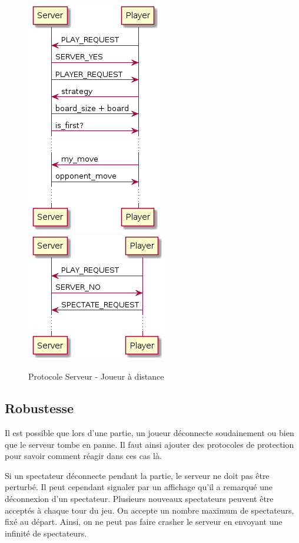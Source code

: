 \documentclass[a4paper]{article}
\begin{document}
%
\begin{figure}[H]
	\centering
	\includegraphics[scale=0.6]{playeryes.png} \hspace{1cm}
	\includegraphics[scale=0.6]{playerno.png}
	\caption{Protocole Serveur - Joueur à distance}
\end{figure}
%


\subsection{Robustesse}

Il est possible que lors d'une partie, un joueur déconnecte soudainement ou 
bien que le serveur tombe en panne. Il faut ainsi ajouter des protocoles de 
protection pour savoir comment réagir dans ces cas là.

Si un spectateur déconnecte pendant la partie, le serveur ne doit pas être 
perturbé. Il peut cependant signaler par un affichage qu'il a remarqué une 
déconnexion d'un spectateur.
Plusieurs nouveaux spectateurs peuvent être acceptés à chaque tour du jeu. On accepte un nombre maximum de spectateurs, fixé au départ.
Ainsi, on ne peut pas faire crasher le serveur en envoyant une infinité de spectateurs. \\
\end{document}
